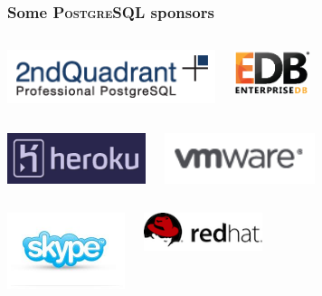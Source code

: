 \documentclass{beamer}
\begin{document}
\begin{frame}
  \frametitle{Some \textsc{PostgreSQL} sponsors}

  \begin{columns}[c]
    \begin{center}
      \includegraphics[height=4.2em]{logo_2q.png}
    \end{center}
    \begin{center}
      \includegraphics[height=3.5em]{logo_edb.png}
    \end{center}
  \end{columns}
  \vfill

  \begin{columns}[c]
    \begin{center}
      \includegraphics[height=4em]{logo_heroku.png}
    \end{center}
    \begin{center}
      \includegraphics[height=4em]{logo_vmware.png}
    \end{center}
  \end{columns}
  \vfill

  \begin{columns}[c]
    \begin{center}
      \includegraphics[height=6em]{logo_skype.png}
    \end{center}
    \begin{center}
      \includegraphics[height=3em]{logo_rh.png}
    \end{center}
  \end{columns}
\end{frame}
\end{document}
